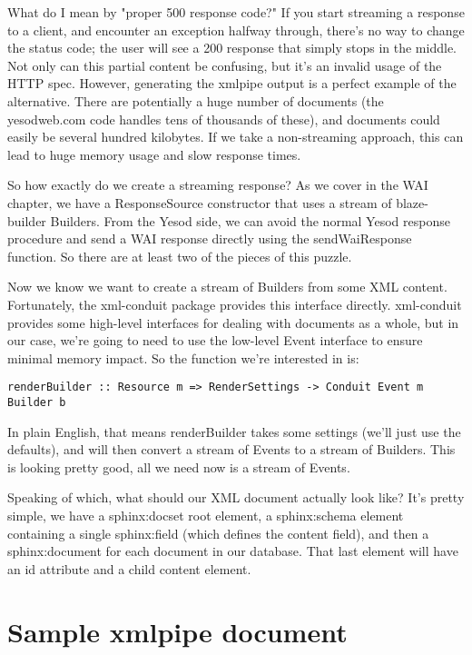 What do I mean by "proper 500 response code?" If you start streaming a response to a client, and encounter an exception halfway through, there's no way to change the status code; the user will see a 200 response that simply stops in the middle. Not only can this partial content be confusing, but it's an invalid usage of the HTTP spec.
However, generating the xmlpipe output is a perfect example of the alternative. There are potentially a huge number of documents (the yesodweb.com code handles tens of thousands of these), and documents could easily be several hundred kilobytes. If we take a non-streaming approach, this can lead to huge memory usage and slow response times.

So how exactly do we create a streaming response? As we cover in the WAI chapter, we have a ResponseSource constructor that uses a stream of blaze-builder Builders. From the Yesod side, we can avoid the normal Yesod response procedure and send a WAI response directly using the sendWaiResponse function. So there are at least two of the pieces of this puzzle.

Now we know we want to create a stream of Builders from some XML content. Fortunately, the xml-conduit package provides this interface directly. xml-conduit provides some high-level interfaces for dealing with documents as a whole, but in our case, we're going to need to use the low-level Event interface to ensure minimal memory impact. So the function we're interested in is:

\begin{lstlisting}
renderBuilder :: Resource m => RenderSettings -> Conduit Event m Builder b
\end{lstlisting}

In plain English, that means renderBuilder takes some settings (we'll just use the defaults), and will then convert a stream of Events to a stream of Builders. This is looking pretty good, all we need now is a stream of Events.

Speaking of which, what should our XML document actually look like? It's pretty simple, we have a sphinx:docset root element, a sphinx:schema element containing a single sphinx:field (which defines the content field), and then a sphinx:document for each document in our database. That last element will have an id attribute and a child content element.

\section{Sample xmlpipe document} %

